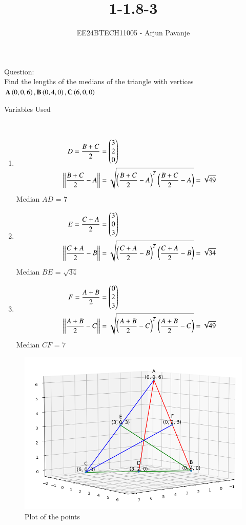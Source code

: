 \documentclass[journal]{IEEEtran}
\begin{document}

\vspace{3cm}

\title{1-1.8-3}
\author{EE24BTECH11005 - Arjun Pavanje
}
{\let\newpage\relax\maketitle}
Question:\\
Find the lengths of the medians of the triangle with vertices $\mathbf{A}\left(0,0,6\right),\mathbf{B}\left(0,4,0\right),\mathbf{C}\left(6,0,0\right)$\\
\solution
\begin{table}[h!]    
  \centering
  
  \caption{Variables Used}
  \label{tab1-1.5-29}
\end{table}\\
\begin{enumerate}
	\item
\begin{align}
	D = \frac{B+C}{2} &= \begin{pmatrix}
		3\\
		2\\
		0
	\end{pmatrix}\\
	\left\lVert\frac{B+C}{2}-A\right\rVert &= \sqrt{\left(\frac{B+C}{2}-A\right)^T \left(\frac{B+C}{2}-A\right)} = \sqrt{49}
\end{align}
Median $AD$ = $7$
\item
\begin{align}
	E = \frac{C+A}{2} &= \begin{pmatrix}
		3\\
		0\\
		3
	\end{pmatrix}\\
	\left\lVert\frac{C+A}{2}-B\right\rVert &= \sqrt{\left(\frac{C+A}{2}-B\right)^T \left(\frac{C+A}{2}-B\right)} = \sqrt{34}
\end{align}
Median $BE$ = $\sqrt{34}$
\item
\begin{align}
	F = \frac{A+B}{2} &= \begin{pmatrix}
		0\\
		2\\
		3
	\end{pmatrix}\\
	\left\lVert\frac{A+B}{2}-C\right\rVert &= \sqrt{\left(\frac{A+B}{2}-C\right)^T \left(\frac{A+B}{2}-C\right)} = \sqrt{49}
\end{align}
Median $CF$ = $7$
		\end{enumerate}
\begin{figure}[h!]
   \centering
   \includegraphics[width = 0.7\linewidth]{figs/Figure_1.png}
   \caption{Plot of the points}
   \label{stemplot}
\end{figure}
\end{document}
